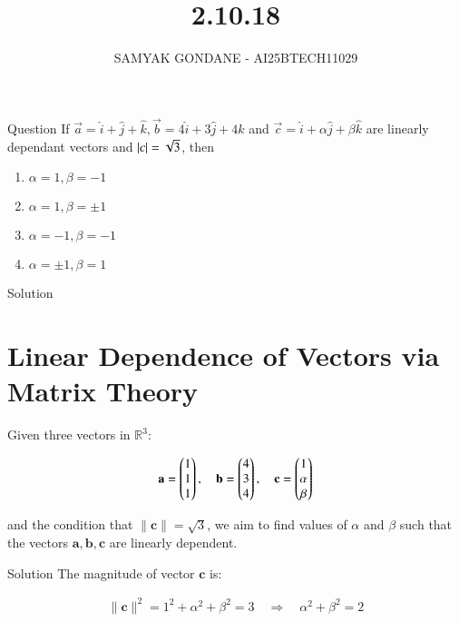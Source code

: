 \documentclass{beamer}
\title 
{2.10.18}
\date{}
\author
{SAMYAK GONDANE - AI25BTECH11029}
\begin{document}
\frame{\titlepage}

\begin{frame}{Question}
If $\vec{a} = \hat{i} + \hat{j} + \hat{k}, \vec{b} = 4\hat{i} + 3\hat{j} + 4\hat{k}$ and $\vec{c} = \hat{i} + \alpha\hat{j} + \beta\hat{k}$ are linearly dependant vectors and $\left\vert c\right\vert = \sqrt{3}$, then
\begin{multicols}{2}
\begin{enumerate}
    \item $\alpha = 1, \beta = -1$
    \item $\alpha = 1, \beta = \pm1$
    \item $\alpha = -1, \beta = -1$
    \item $\alpha = \pm1, \beta = 1$
\end{enumerate}
\end{multicols}
\end{frame}

\begin{frame}{Solution}
\section*{Linear Dependence of Vectors via Matrix Theory}

Given three vectors in $\mathbb{R}^3$:


\begin{align}
\mathbf{a} = \begin{pmatrix}1 \\ 1 \\ 1\end{pmatrix}, \quad
\mathbf{b} = \begin{pmatrix}4 \\ 3 \\ 4\end{pmatrix}, \quad
\mathbf{c} = \begin{pmatrix}1 \\ \alpha \\ \beta\end{pmatrix}
\end{align}


and the condition that $\|\mathbf{c}\| = \sqrt{3}$, we aim to find values of $\alpha$ and $\beta$ such that the vectors $\mathbf{a}, \mathbf{b}, \mathbf{c}$ are linearly dependent.
\end{frame}

\begin{frame}{Solution}
The magnitude of vector $\mathbf{c}$ is:


\begin{align}
\|\mathbf{c}\|^2 = 1^2 + \alpha^2 + \beta^2 = 3 \quad \Rightarrow \quad \alpha^2 + \beta^2 = 2 \tag{1}
\end{align}
\end{frame}
\end{document}
